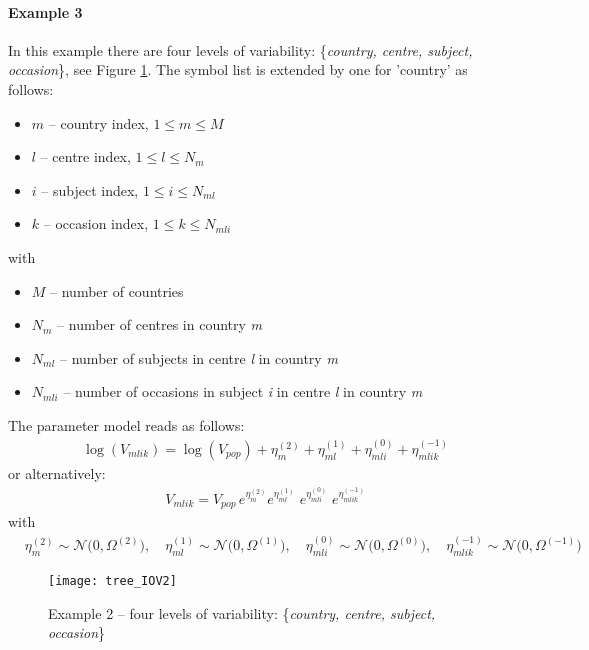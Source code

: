 \paragraph{Example 3}
In this example there are four levels of variability: \{\textit{country, centre, subject, occasion}\}, see Figure \ref{tree_IOV2}. The symbol list is extended by one for 'country' as follows:
\begin{itemize}
\item
$m$ -- country index, $1\le m \le M$
\item
$l$ -- centre index, $1\le l \le N_m$
\item
$i$ -- subject index, $1\le i \le N_{ml}$
\item
$k$ -- occasion index, $1\le k \le N_{mli}$
\end{itemize} 
with
\begin{itemize}
\item
$M$ -- number of countries
\item
$N_m$ -- number of centres in country \textit{m}
\item
$N_{ml}$ -- number of subjects in centre \textit{l} in country \textit{m}
\item
$N_{mli}$ -- number of occasions in subject \textit{i} in centre \textit{l} in country \textit{m}
\end{itemize} 
The parameter model reads as follows:
\begin{align*}
& \log(V_{mlik}) = \log(V_{pop}) + \eta_m^{(2)} + \eta_{ml}^{(1)} + \eta_{mli}^{(0)} + \eta_{mlik}^{(-1)}  
\end{align*} 
or alternatively:
\begin{align*}
& V_{mlik} = V_{pop} \, e^{\eta_m^{(2)}} e^{\eta_{ml}^{(1)}} \; e^{\eta_{mli}^{(0)}} \; e^{\eta_{mlik}^{(-1)}}  
\end{align*} 
with
\begin{align*}
 & \eta_m^{(2)} \sim \mathcal{N}\big(0,\Omega^{(2)}\big), \quad \eta_{ml}^{(1)} \sim \mathcal{N}\big(0,\Omega^{(1)}\big), \quad
 \eta_{mli}^{(0)} \sim \mathcal{N}\big(0,\Omega^{(0)}\big), \quad \eta_{mlik}^{(-1)} \sim \mathcal{N}\big(0,\Omega^{(-1)}\big) 
\end{align*} 



\begin{figure}[htb!]
\centering
  \texttt{[image: tree\_IOV2]}
 \caption{Example 2 -- four levels of variability:  \{\textit{country, centre, subject, occasion}\}}
 \label{tree_IOV2}
 \end{figure}

